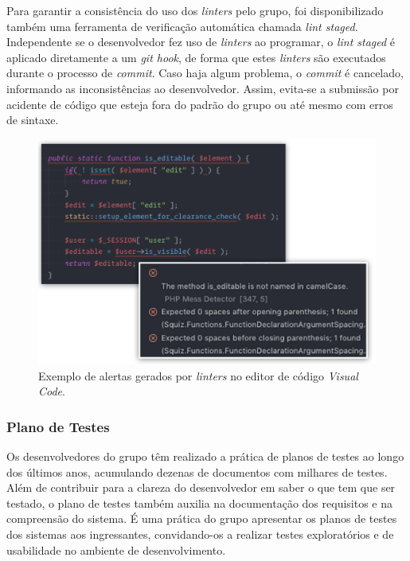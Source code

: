Para garantir a consistência do uso dos \emph{linters} pelo grupo, foi disponibilizado também uma ferramenta de verificação automática chamada \emph{lint staged}. Independente se o desenvolvedor fez uso de \emph{linters} ao programar, o \emph{lint staged} é aplicado diretamente a um \emph{git hook}, de forma que estes \emph{linters} são executados durante o processo de \emph{commit}. Caso haja algum problema, o \emph{commit} é cancelado, informando as inconsistências ao desenvolvedor. Assim, evita-se a submissão por acidente de código que esteja fora do padrão do grupo ou até mesmo com erros de sintaxe.

\begin{figure}[H]
    \centering
    \includegraphics[width=15cm]{source/4-solucao/images/validores-sintaxe.png}
    \caption{Exemplo de alertas gerados por \emph{linters} no editor de código \emph{Visual Code}.}
    \label{fig:validores-sintaxe}
\end{figure}

\hypertarget{plano-de-testes}{%
\subsubsection{Plano de Testes}\label{plano-de-testes}}

Os desenvolvedores do grupo têm realizado a prática de planos de testes ao longo dos últimos anos, acumulando dezenas de documentos com milhares de testes. Além de contribuir para a clareza do desenvolvedor em saber o que tem que ser testado, o plano de testes também auxilia na documentação dos requisitos e na compreensão do sistema. É uma prática do grupo apresentar os planos de testes dos sistemas aos ingressantes, convidando-os a realizar testes exploratórios e de usabilidade no ambiente de desenvolvimento.

